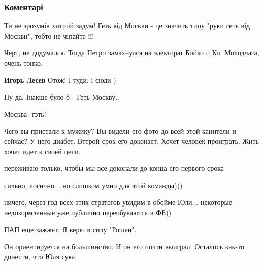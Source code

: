  
 
 
 
 
\subsubsection{Коментарі}

\begin{itemize} %
Ти не зрозумів хитрий задум! Геть від Москви - це значить типу "руки геть від Москви", тобто не чіпайте її!

\begin{itemize} %
Черт, не додумался. Тогда Петро замахнулся на электорат Бойко и Ко. Молодчага, очень тонко.

\textbf{Игорь Лесев} Отож! І туди, і сюди )

Ну да.
Інакше було б - Геть Москву..

Москва- гэть!
\end{itemize} %


Чего вы пристали к мужику? Вы видели его фото до всей этой канители и сейчас? У
него диабет. Вттрой срок его доконает. Хочет человек проиграть. Жить хочет идет
к своей цели.

\begin{itemize} %
переживаю только, чтобы мы все доконали до конца его первого срока
\end{itemize} %


сильно, логично... но слишком умно для этой команды)))

\begin{itemize} %
ничего, через год всех этих стратегов увидим в обойме Юли... некоторые недокормленные уже публично переобуваются в ФБ))
\end{itemize} %

ПАП еще зажжет. Я верю в силу "Рошен".

Он ориентируется на большинство. И он его почти выиграл. Осталось как-то донести, что Юля сука


\end{itemize}
